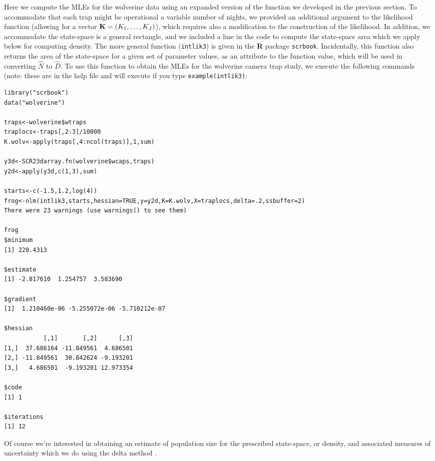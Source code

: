 Here we compute the MLEs for the wolverine data using an expanded
version of the function we developed in the previous section. To
accommodate that each trap might be operational a variable number of
nights, we provided an additional argument to the likelihood function
(allowing for a vector ${\bf K}= (K_{1},\ldots,K_{J})$), which requires also a modification to the
construction of the likelihood.  In addition,
we accommodate  the state-space is a general rectangle, and
we included a line in the code to compute the state-space area which
we apply below for computing density.  The more general function
(\mbox{\tt intlik3}) is given in the {\bf R} package \mbox{\tt scrbook}. 
Incidentally, this function also returns the area of the state-space for a given set
of parameter values, as an attribute to the function value, which will
be used in converting $\hat{N}$ to $\hat{D}$.
To use this function to obtain the MLEs for the wolverine camera trap
study, we execute the following commands (note: these are in the help
file and will execute if you type \mbox{\tt example(intlik3)}:
{\small
\begin{verbatim}
library("scrbook")
data("wolverine")
 
traps<-wolverine$wtraps
traplocs<-traps[,2:3]/10000
K.wolv<-apply(traps[,4:ncol(traps)],1,sum)

y3d<-SCR23darray.fn(wolverine$wcaps,traps)
y2d<-apply(y3d,c(1,3),sum)

starts<-c(-1.5,1.2,log(4))
frog<-nlm(intlik3,starts,hessian=TRUE,y=y2d,K=K.wolv,X=traplocs,delta=.2,ssbuffer=2)
There were 23 warnings (use warnings() to see them)

frog
$minimum
[1] 220.4313

$estimate
[1] -2.817610  1.254757  3.583690

$gradient
[1]  1.210460e-06 -5.255072e-06 -5.710212e-07

$hessian
           [,1]       [,2]      [,3]
[1,]  37.686164 -11.849561  4.686501
[2,] -11.849561  30.842624 -9.193201
[3,]   4.686501  -9.193201 12.973354

$code
[1] 1

$iterations
[1] 12
\end{verbatim}
}
Of course we're interested in obtaining an estimate of population size
for the prescribed state-space, or density, and associated measures of
uncertainty which we do using the delta method
\citep[][Appendix F4]{williams_etal:2002}.
